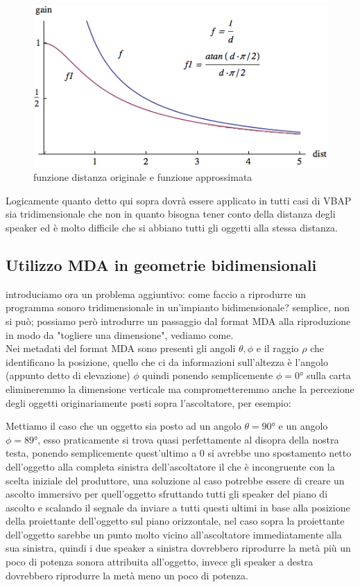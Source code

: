 \documentclass[12pt,a4paper]{report}
\begin{document}
\begin{figure}[htbp]
	\centering
	\includegraphics[scale=0.60]{figures/distance.png}
	\caption {funzione distanza originale e funzione approssimata} 
	\label{fig:distance}
	\end{figure} 

Logicamente quanto detto qui sopra dovrà essere applicato in tutti casi di VBAP sia tridimensionale che non in quanto bisogna tener conto della distanza degli speaker ed è molto difficile che si abbiano tutti gli oggetti alla stessa distanza.\\

\subsection{Utilizzo MDA in geometrie bidimensionali}

introduciamo ora un problema aggiuntivo: come faccio a riprodurre un programma sonoro tridimensionale in un'impianto bidimensionale? semplice, non si può; possiamo però introdurre un passaggio dal format MDA alla riproduzione in modo da "togliere una dimensione", vediamo come.\\

Nei metadati del format MDA sono presenti gli angoli $\theta, \phi$ e il raggio $\rho$ che identificano la posizione, quello che ci da informazioni sull'altezza è l'angolo (appunto detto di elevazione) $\phi$ quindi ponendo semplicemente $\phi=0°$ sulla carta elimineremmo la dimensione verticale ma comprometteremmo anche la percezione degli oggetti originariamente posti sopra l'ascoltatore, per esempio:

Mettiamo il caso che un oggetto sia posto ad un angolo $	\theta= 90° $ e un angolo $\phi=89°$, esso praticamente si trova quasi perfettamente al disopra della nostra testa, ponendo semplicemente quest'ultimo a $0$ si avrebbe uno spostamento netto dell'oggetto alla completa sinistra dell'ascoltatore il che è incongruente con la scelta iniziale del produttore, una soluzione al caso potrebbe essere di creare un ascolto immersivo per quell'oggetto sfruttando tutti gli speaker del piano di ascolto e scalando il segnale da inviare a tutti questi ultimi in base alla posizione della proiettante dell'oggetto sul piano orizzontale, nel caso sopra la proiettante dell'oggetto sarebbe un punto molto vicino all'ascoltatore immediatamente alla sua sinistra, quindi i due speaker a sinistra dovrebbero riprodurre la metà più un poco di potenza sonora attribuita all'oggetto, invece gli speaker a destra dovrebbero riprodurre la metà meno un poco di potenza.
\end{document}
